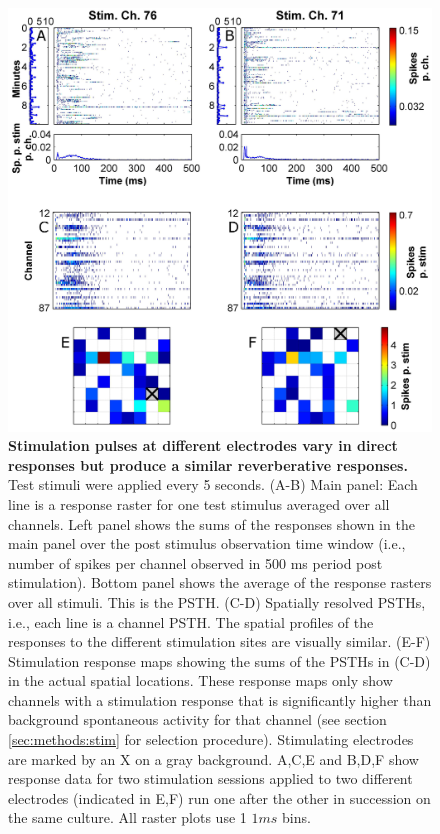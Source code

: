         \begin{figure}[!htb]
            \centering
            \includegraphics[width=14cm]{chapter3/figures/stimExample/stimExample.jpg}

            \caption[Example of responses to test stimuli applied at 2 different electrodes]{\textbf{Stimulation pulses at different electrodes vary in direct responses but produce a similar reverberative responses.} Test stimuli were applied every 5 seconds. (A-B) Main panel: Each line is a response raster for one test stimulus averaged over all channels. Left panel shows the sums of the responses shown in the main panel over the post stimulus observation time window (i.e., number of spikes per channel observed in 500 ms period post stimulation). Bottom panel shows the average of the response rasters over all stimuli. This is the PSTH. (C-D) Spatially resolved PSTHs, i.e., each line is a channel PSTH. The spatial profiles of the responses to the different stimulation sites are visually similar. (E-F) Stimulation response maps showing the sums of the PSTHs in (C-D) in the actual spatial locations. These response maps only show channels with a stimulation response that is significantly higher than background spontaneous activity for that channel (see section \ref{sec:methods:stim} for selection procedure). Stimulating electrodes are marked by an X on a gray background. A,C,E and B,D,F show response data for two stimulation sessions applied to two different electrodes (indicated in E,F) run one after the other in succession on the same culture. All raster plots use 1 \(1ms\) bins.}
            \label{fig:activity:stimExample}
        \end{figure}

